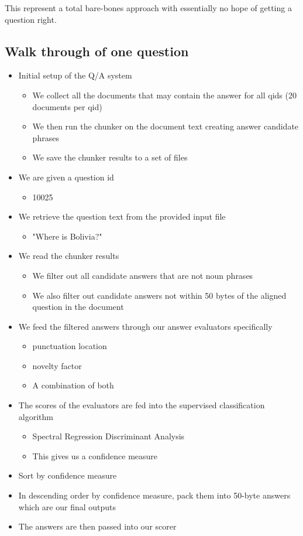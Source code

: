 \documentclass{article}
\begin{document}
This represent a total bare-bones approach with essentially no hope of getting a
question right.

\subsection{Walk through of one question}
\begin{itemize}
\item Initial setup of the Q/A system
    \begin{itemize}
    \item We collect all the documents that may contain the answer for all qids (20 documents per qid)
    \item We then run the chunker on the document text creating answer candidate phrases
    \item We save the chunker results to a set of files
    \end{itemize}
\item We are given a question id
    \begin{itemize}
    \item 10025
    \end{itemize}
\item We retrieve the question text from the provided input file
    \begin{itemize}
    \item "Where is Bolivia?"
    \end{itemize}
\item We read the chunker results 
    \begin{itemize}
    \item We filter out all candidate answers that are not noun phrases
    \item We also filter out candidate answers not within 50 bytes of the aligned question in the document
    \end{itemize}
\item We feed the filtered answers through our answer evaluators specifically
    \begin{itemize}
    \item punctuation location
    \item novelty factor
    \item A combination of both
    \end{itemize}
\item The scores of the evaluators are fed into the supervised classification algorithm
    \begin{itemize}
    \item Spectral Regression Discriminant Analysis 
    \item This gives us a confidence measure
    \end{itemize}
\item Sort by confidence measure 
\item In descending order by confidence measure, pack them into 50-byte answers which are our final outputs
\item The answers are then passed into our scorer
\end{itemize}
\end{document}
